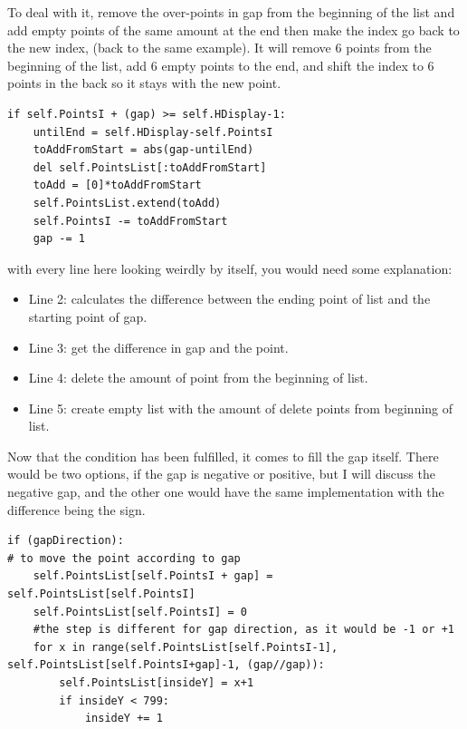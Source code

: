 To deal with it, remove the over-points in gap from the beginning of the list and add empty points of the same amount at the end then make the index go back to the new index, (back to the same example). It will remove 6 points from the beginning of the list, add 6 empty points to the end, and shift the index to 6 points in the back so it stays with the new point.

\begin{listing}[H]
\begin{verbatim}
if self.PointsI + (gap) >= self.HDisplay-1:
	untilEnd = self.HDisplay-self.PointsI
	toAddFromStart = abs(gap-untilEnd)
	del self.PointsList[:toAddFromStart]
	toAdd = [0]*toAddFromStart
	self.PointsList.extend(toAdd)
	self.PointsI -= toAddFromStart
	gap -= 1
\end{verbatim}
\end{listing}

with every line here looking weirdly by itself, you would need some explanation:

\begin{itemize}
	\item Line 2: calculates the difference between the ending point of list and the starting point of gap.
	\item Line 3: get the difference in gap and the point.
	\item Line 4: delete the amount of point from the beginning of list.
	\item Line 5: create empty list with the amount of delete points from beginning of list.
\end{itemize}

Now that the condition has been fulfilled, it comes to fill the gap itself. There would be two options, if the gap is negative or positive, but I will discuss the negative gap, and the other one would have the same implementation with the difference being the sign.

\begin{listing}[H]
	\begin{verbatim}
if (gapDirection):
# to move the point according to gap
	self.PointsList[self.PointsI + gap] = self.PointsList[self.PointsI]
	self.PointsList[self.PointsI] = 0
	#the step is different for gap direction, as it would be -1 or +1
	for x in range(self.PointsList[self.PointsI-1], self.PointsList[self.PointsI+gap]-1, (gap//gap)):
		self.PointsList[insideY] = x+1
		if insideY < 799:
			insideY += 1
	\end{verbatim}
\end{listing}

